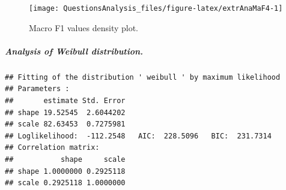 \documentclass[
]{article}
\newenvironment{Shaded}{\begin{snugshade}}{\end{snugshade}}
\newcommand{\DecValTok}[1]{\textcolor[rgb]{0.00,0.00,0.81}{#1}}
\newcommand{\FunctionTok}[1]{\textcolor[rgb]{0.00,0.00,0.00}{#1}}
\newcommand{\NormalTok}[1]{#1}
\newcommand{\OtherTok}[1]{\textcolor[rgb]{0.56,0.35,0.01}{#1}}
\newcommand{\SpecialCharTok}[1]{\textcolor[rgb]{0.00,0.00,0.00}{#1}}
\newcommand{\StringTok}[1]{\textcolor[rgb]{0.31,0.60,0.02}{#1}}
\begin{document}
\begin{figure}

{\centering \texttt{[image: QuestionsAnalysis\_files/figure-latex/extrAnaMaF4-1]} 

}

\caption{Macro F1 values density plot.}\label{fig:extrAnaMaF4}
\end{figure}

\hypertarget{analysis-of-weibull-distribution.-1}{%
\subparagraph{Analysis of Weibull distribution.}\label{analysis-of-weibull-distribution.-1}}

\begin{Shaded}
\end{Shaded}

\begin{verbatim}
## Fitting of the distribution ' weibull ' by maximum likelihood 
## Parameters : 
##       estimate Std. Error
## shape 19.52545  2.6044202
## scale 82.63453  0.7275981
## Loglikelihood:  -112.2548   AIC:  228.5096   BIC:  231.7314 
## Correlation matrix:
##           shape     scale
## shape 1.0000000 0.2925118
## scale 0.2925118 1.0000000
\end{verbatim}

\begin{Shaded}
\end{Shaded}
\end{document}

